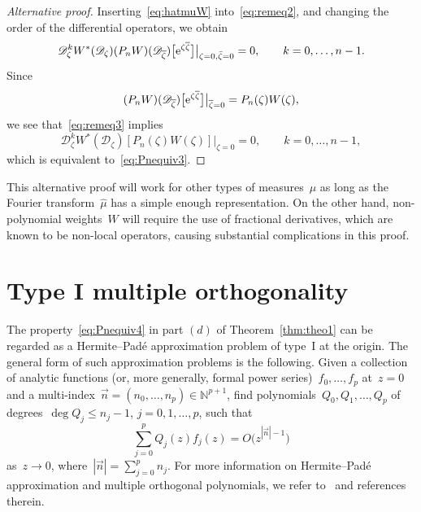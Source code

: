 \documentclass[pdftex]{sigma}
\numberwithin{equation}{section}
\newcommand*{\Nset}{\mathbb{N}} %
\begin{document}
\begin{proof}[Alternative proof]
 Inserting~\eqref{eq:hatmuW} into~\eqref{eq:remeq2}, and changing the order of the differential operators, we obtain
 \begin{equation}
 \label{eq:remeq3}
 \mathscr{D}_{\zeta}^k W^*(\mathscr{D}_\zeta) (P_n W)(\mathscr{D}_{\overline{\zeta}}) \big[{\rm e}^{\zeta \overline{\zeta}}\big] \big|_{\zeta=0, \bar{\zeta} =0}= 0, \qquad k=0,\dots,n-1.
 \end{equation}
 Since
 \begin{equation*}
 (P_n W)(\mathscr{D}_{\overline{\zeta}}) \big[{\rm e}^{\zeta \overline{\zeta}} \big]	\big|_{\overline{\zeta}=0} = P_n(\zeta) W(\zeta),
 \end{equation*}
 we see that~\eqref{eq:remeq3} implies
 \begin{equation*}
 \mathscr{D}_{\zeta}^k W^*(\mathscr{D}_\zeta) [P_n(\zeta)W(\zeta)] \big|_{\zeta=0} = 0,\qquad k=0,\dots,n-1,
 \end{equation*}
 which is equivalent to~\eqref{eq:Pnequiv3}.
 \end{proof}

 This alternative proof will work for other types of measures~$\mu$ as long as the Fourier transform~$\widehat{\mu}$ has a simple enough representation. On the other hand, non-polynomial weights~$W$ will require the use of fractional derivatives, which are known to be non-local operators, causing substantial complications in this proof.

 \section{Type I multiple orthogonality}
 \label{section4}

 The property~\eqref{eq:Pnequiv4} in part $(d)$ of Theorem~\ref{thm:theo1} can be regarded as a Hermite--Pad\'{e} approximation problem of type~I at the origin. The general form of such approximation problems is the following. Given a collection of analytic functions (or, more generally, formal power series)~$f_0, \dots, f_p$ at~$z=0$ and a multi-index~$\vec{n} = (n_0, \dots, n_p) \in \Nset^{p+1}$, find polynomials~$Q_0, Q_1, \dots, Q_p$ of degrees~$\deg Q_j \leq n_j-1$, $j=0,1, \dots, p$, such that
 \begin{equation*}
 \sum_{j=0}^p Q_j(z) f_j(z) = O\big(z^{|\vec{n}|-1}\big)
 \end{equation*}
 as~$z \to 0$, where~$|\vec{n}| = \sum_{j=0}^p n_j$. For more information on Hermite--Pad\'{e} approximation and multiple orthogonal polynomials, we refer to~\cite{VA} and references therein.
\end{document}
